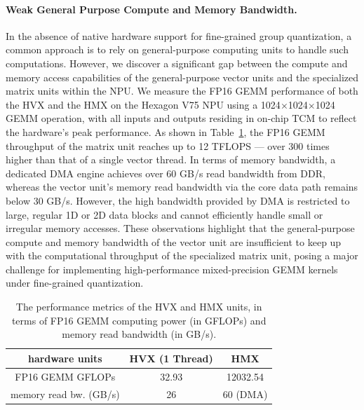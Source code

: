 \paragraph{Weak General Purpose Compute and Memory Bandwidth.} In the absence of native hardware support for fine-grained group quantization, a common approach is to rely on general-purpose computing units to handle such computations. However, we discover a significant gap between the compute and memory access capabilities of the general-purpose vector units and the specialized matrix units within the NPU. We measure the FP16 GEMM performance of both the HVX and the HMX on the Hexagon V75 NPU using a 1024$\times$1024$\times$1024 GEMM operation, with all inputs and outputs residing in on-chip TCM to reflect the hardware's peak performance. As shown in Table~\ref{tab:hexagon-npu-profile}, the FP16 GEMM throughput of the matrix unit reaches up to 12 TFLOPS — over 300 times higher than that of a single vector thread. In terms of memory bandwidth, a dedicated DMA engine achieves over 60 GB/s read bandwidth from DDR, whereas the vector unit's memory read bandwidth via the core data path remains below 30 GB/s. However, the high bandwidth provided by DMA is restricted to large, regular 1D or 2D data blocks and cannot efficiently handle small or irregular memory accesses. These observations highlight that the general-purpose compute and memory bandwidth of the vector unit are insufficient to keep up with the computational throughput of the specialized matrix unit, posing a major challenge for implementing high-performance mixed-precision GEMM kernels under fine-grained quantization.

\begin{table}[h]
    \centering
    \begin{tabular}{ccc}
        \hline
        hardware units & HVX (1 Thread) & HMX \\
        \hline
        FP16 GEMM GFLOPs & 32.93 & 12032.54 \\
        memory read bw. (GB/s) & 26 & 60 (DMA) \\
        \hline
    \end{tabular}
    \caption{The performance metrics of the HVX and HMX units, in terms of FP16 GEMM computing power (in GFLOPs) and memory read bandwidth (in GB/s).}
    \label{tab:hexagon-npu-profile}
    \vspace{-1em}
\end{table}

